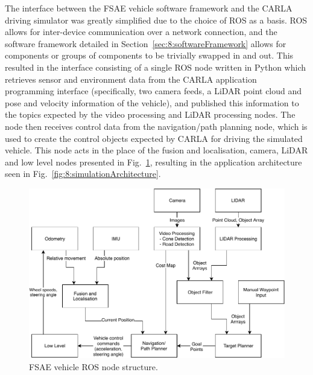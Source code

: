 
The interface between the FSAE vehicle software framework and the CARLA driving simulator was greatly simplified due to the choice of ROS as a basis.
ROS allows for inter-device communication over a network connection, and the software framework detailed in Section~\ref{sec:8:softwareFramework} allows for components or groups of components to be trivially swapped in and out.
This resulted in the interface consisting of a single ROS node written in Python which retrieves sensor and environment data from the CARLA application programming interface (specifically, two camera feeds, a LiDAR point cloud and pose and velocity information of the vehicle), and published this information to the topics expected by the video processing and LiDAR processing nodes.
The node then receives control data from the navigation/path planning node, which is used to create the control objects expected by CARLA for driving the simulated vehicle.
This node acts in the place of the fusion and localisation, camera, LiDAR and low level nodes presented in Fig.~\ref{fig:8:fsaeRosNodes}, resulting in the application architecture seen in Fig.~\ref{fig:8:simulationArchitecture}.

\begin{figure}[H] 
	\centering
	\includegraphics[width=0.9\columnwidth]{fsaeRosNodes}
	\caption{FSAE vehicle ROS node structure.}
	\label{fig:8:fsaeRosNodes}
\end{figure}

